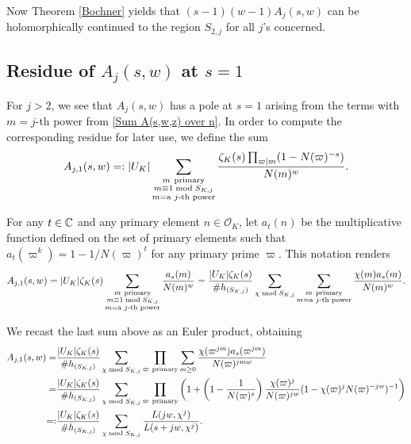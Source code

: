\documentclass[twoside,leqno,10pt, A4]{amsart}
\begin{document}
Now Theorem \ref{Bochner} yields that $(s-1)(w-1)A_j(s,w)$ can be holomorphically continued to the region $S_{2,j}$ for all $j$'s concerned.

\subsection{Residue of $A_j(s,w)$ at $s=1$}
\label{sec:resA}

For $j>2$, we see that $A_j(s,w)$ has a pole at $s=1$ arising from the terms with $m= \text{$j$-th power}$ from \eqref{Sum A(s,w,z) over n}. In order
to compute the corresponding residue for later use, we define the sum
\begin{align*}
\begin{split}
 A_{j,1}(s,w) =: |U_K| \sum_{\substack{m \mathrm{\ primary} \\ m \equiv 1  \bmod {S_{K,j}} \\ m =  \text{a $j$-th power}}}\frac{\zeta_K(s)\prod_{\varpi |
m}(1-N(\varpi)^{-s}) }{N(m)^w}.
\end{split}
\end{align*}

 For any $t \in \mathbb C$ and any primary element $n \in \mathcal O_K$, let $a_t(n)$ be the multiplicative function defined on the set of primary
elements such that $a_t(\varpi^k)=1-1/N(\varpi)^t$ for any primary prime $\varpi$.  This notation renders
\begin{align*}
\begin{split}
 A_{j,1}(s,w)
=   |U_K|\zeta_K(s)\sum_{\substack{m \mathrm{\ primary} \\ m \equiv 1  \bmod {S_{K,j}} \\ m =  \text{a $j$-th power}}}\frac{a_s(m) }{N(m)^w}
=\frac {|U_K| \zeta_K(s)}{\#h_{(S_{K,j})}}\sum_{\chi \bmod {S_{K,j}}}\sum_{\substack{m \mathrm{\ primary} \\ m =  \text{a $j$-th power}}}\frac{\chi(m)a_s(m)
}{N(m)^w} .
\end{split}
\end{align*}

 We recast the last sum above as an Euler product, obtaining
\begin{align} \label{residuesgen}
\begin{split}
	 A_{j,1}(s,w)
=&   \frac {|U_K|\zeta_K(s)}{\#h_{(S_{K,j})}}\sum_{\chi \bmod {S_{K,j}}} \prod_{\varpi \mathrm{\ primary}}\sum_{\substack{m \geq0}}\frac{\chi(\varpi^{jm})
a_s(\varpi^{jm})}{N(\varpi)^{jmw}} \\
=& \frac {|U_K|\zeta_K(s)}{\#h_{(S_{K,j})}}\sum_{\chi \bmod {S_{K,j}}}\prod_{\varpi \mathrm{\ primary}}\left(1+\left( 1-\frac 1{N(\varpi)^s} \right) \frac
{\chi(\varpi)^j}{N(\varpi)^{jw}}(1-\chi(\varpi)^jN(\varpi)^{-jw})^{-1} \right) \\
=: &  \frac {|U_K|\zeta_K(s)}{\#h_{(S_{K,j})}}\sum_{\chi \bmod {S_{K,j}}} \frac{L(jw, \chi^j)}{L(s+jw, \chi^j)}.
\end{split}
\end{align}
\end{document}
